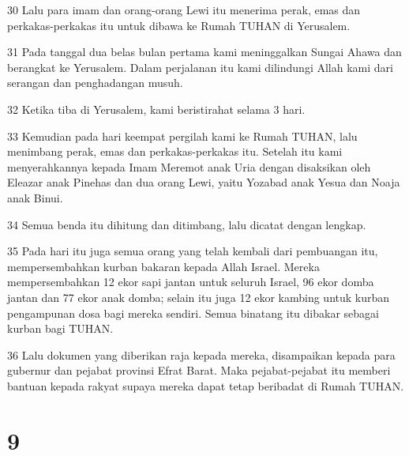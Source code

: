 \par 30 Lalu para imam dan orang-orang Lewi itu menerima perak, emas dan perkakas-perkakas itu untuk dibawa ke Rumah TUHAN di Yerusalem.
\par 31 Pada tanggal dua belas bulan pertama kami meninggalkan Sungai Ahawa dan berangkat ke Yerusalem. Dalam perjalanan itu kami dilindungi Allah kami dari serangan dan penghadangan musuh.
\par 32 Ketika tiba di Yerusalem, kami beristirahat selama 3 hari.
\par 33 Kemudian pada hari keempat pergilah kami ke Rumah TUHAN, lalu menimbang perak, emas dan perkakas-perkakas itu. Setelah itu kami menyerahkannya kepada Imam Meremot anak Uria dengan disaksikan oleh Eleazar anak Pinehas dan dua orang Lewi, yaitu Yozabad anak Yesua dan Noaja anak Binui.
\par 34 Semua benda itu dihitung dan ditimbang, lalu dicatat dengan lengkap.
\par 35 Pada hari itu juga semua orang yang telah kembali dari pembuangan itu, mempersembahkan kurban bakaran kepada Allah Israel. Mereka mempersembahkan 12 ekor sapi jantan untuk seluruh Israel, 96 ekor domba jantan dan 77 ekor anak domba; selain itu juga 12 ekor kambing untuk kurban pengampunan dosa bagi mereka sendiri. Semua binatang itu dibakar sebagai kurban bagi TUHAN.
\par 36 Lalu dokumen yang diberikan raja kepada mereka, disampaikan kepada para gubernur dan pejabat provinsi Efrat Barat. Maka pejabat-pejabat itu memberi bantuan kepada rakyat supaya mereka dapat tetap beribadat di Rumah TUHAN.

\chapter{9}

